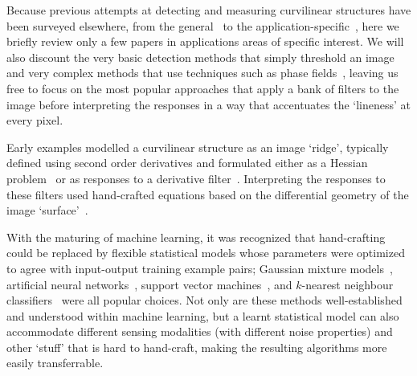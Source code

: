 
Because previous attempts at detecting and measuring curvilinear structures have been surveyed elsewhere, from the general~\cite{Papari_Petkov_IVC11} to the application-specific~\cite{Kirbas_Quek_ACMCS04,Lesage_etal_MIA09}, here we briefly review only a few papers in applications areas of specific interest. We will also discount the very basic detection methods that simply threshold an image~\cite{Jiang_Mojon_TPAMI03} and very complex methods that use techniques such as phase fields~\cite{Peng_etal_IJCV09}, leaving us free to focus on the most popular approaches that apply a bank of filters to the image before interpreting the responses in a way that accentuates the `lineness' at every pixel.

Early examples modelled a curvilinear structure as an image `ridge', typically defined using second order derivatives and formulated either as a Hessian problem~\cite{Frangi_etal_MICCAI98,Sato_etal_MIA98} or as responses to a derivative filter~\cite{Staal_etal_TMI04,Aylward_Bullitt_TMI02,Steger_TPAMI98,Koenderink_vanDoorn_TPAMI92}. Interpreting the responses to these filters used hand-crafted equations based on the differential geometry of the image `surface'~\cite{Frangi_etal_MICCAI98,Sato_etal_MIA98}.

With the maturing of machine learning, it was recognized that hand-crafting could be replaced by flexible statistical models whose parameters were optimized to agree with input-output training example pairs; Gaussian mixture models~\cite{Soares_etal_TMI06}, %
artificial neural networks~\cite{Marin_etal_TMI11,Minh_Hinton_ECCV10}, %
support vector machines~\cite{Ricci_Perfetti_TMI07,Gonzalez_etal_CVPR09}, and %
$k$-nearest neighbour classifiers~\cite{Staal_etal_TMI04} were all popular choices. Not only are these methods well-established and understood within machine learning, but a learnt statistical model can also accommodate different sensing modalities (with different noise properties) and other `stuff' that is hard to hand-craft, making the resulting algorithms more easily transferrable.


